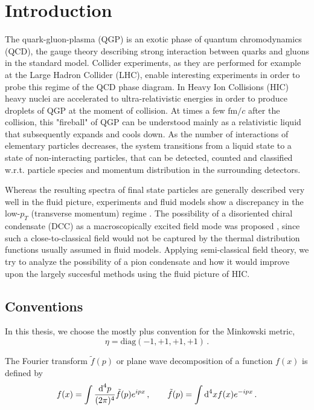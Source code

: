 \chapter{Introduction}

The quark-gluon-plasma (QGP) is an exotic phase  of quantum chromodynamics (QCD), the gauge theory describing strong interaction between quarks and gluons in the standard model. Collider experiments, as they are performed for example at the Large Hadron Collider (LHC), enable interesting experiments in order to probe this regime of the QCD phase diagram. In Heavy Ion Collisions (HIC) heavy nuclei are accelerated to ultra-relativistic energies in order to produce droplets of QGP at the moment of collision. At times a few ${\text{fm}/c}$ after the collision, this "fireball" of QGP can be understood mainly as a relativistic liquid that subsequently expands and cools down. As the number of interactions of elementary particles decreases, the system transitions from a liquid state to a state of non-interacting particles, that can be detected, counted and classified w.r.t. particle species and momentum distribution in the surrounding detectors.

Whereas the resulting spectra of final state particles are generally described very well in the fluid picture, experiments \cite{ALICECollaboration_2022} and fluid models show a discrepancy in the low-$p_T$ (transverse momentum) regime \cite{KirchnerEtAl_2023}. The possibility of a disoriented chiral condensate (DCC) as a macroscopically excited field mode was proposed \cite{Bjorken_1997, Amelino-CameliaEtAl_1997, MohantySerreau_2005}, since such a close-to-classical field would not be captured by the thermal distribution functions usually assumed in fluid models. Applying semi-classical field theory, we try to analyze the possibility of a pion condensate and how it would improve upon the largely succesful methods using the fluid picture of HIC.

\section{Conventions}

In this thesis, we choose the mostly plus convention for the Minkowski metric,
\begin{equation}
    \eta=\text{diag}(-1,+1,+1,+1)\,.
\end{equation}

The Fourier transform $\tilde{f}(p)$ or plane wave decomposition of a function $f(x)$ is defined by
\begin{equation}
    f(x)=\int\frac{\text{d}^4p}{(2\pi)^4}\tilde{f}(p)e^{{i} px}\,,\qquad \tilde{f}(p)=\int\text{d}^4x f(x)e^{-{i} px}\,.
    \label{eq:FourierConvention}
\end{equation}